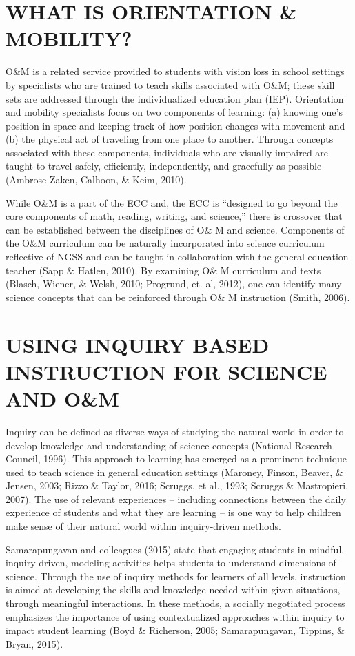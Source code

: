 \documentclass[11.5pt]{sig-alternate} %
\begin{document}
\begin{large}
\section*{WHAT IS ORIENTATION \& MOBILITY?}

O\&M is a related service provided to students with vision loss in school settings by specialists who are trained to teach skills associated with O\&M; these skill sets are addressed through the individualized education plan (IEP).  Orientation and mobility specialists focus on two components of learning: (a) knowing one’s position in space and keeping track of how position changes with movement and (b) the physical act of traveling from one place to another.  Through concepts associated with these components, individuals who are visually impaired are taught to travel safely, efficiently, independently, and gracefully as possible (Ambrose-Zaken, Calhoon, \& Keim, 2010). 
	
While O\&M is a part of the ECC and, the ECC is “designed to go beyond the core components of math, reading, writing, and science,” there is crossover that can be established between the disciplines of O\& M and science.  Components of the O\&M curriculum can be naturally incorporated into science curriculum reflective of NGSS and can be taught in collaboration with the general education teacher (Sapp \& Hatlen, 2010).  By examining O\& M curriculum and texts (Blasch, Wiener, \& Welsh, 2010; Progrund, et. al, 2012), one can identify many science concepts that can be reinforced through O\& M instruction (Smith, 2006).
 
\section*{USING INQUIRY BASED INSTRUCTION FOR SCIENCE AND O\&M}

Inquiry can be defined as diverse ways of studying the natural world in order to develop knowledge and understanding of science concepts (National Research Council, 1996).  This approach to learning has emerged as a prominent technique used to teach science in general education settings (Maroney, Finson, Beaver, \& Jensen, 2003; Rizzo \& Taylor, 2016; Scruggs, et al., 1993; Scruggs \& Mastropieri, 2007).  The use of relevant experiences – including connections between the daily experience of students and what they are learning – is one way to help children make sense of their natural world within inquiry-driven methods.  

Samarapungavan and colleagues (2015) state that engaging students in mindful, inquiry-driven, modeling activities helps students to understand dimensions of science.  Through the use of inquiry methods for learners of all levels, instruction is aimed at developing the skills and knowledge needed within given situations, through meaningful interactions.  In these methods, a socially negotiated process emphasizes the importance of using contextualized approaches within inquiry to impact student learning (Boyd \& Richerson, 2005; Samarapungavan, Tippins, \& Bryan, 2015).


\end{large}
\end{document}
